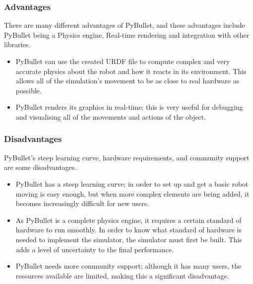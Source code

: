 \documentclass[a4paper,11pt]{article}
\begin{document}
\subsubsection{Advantages}

There are many different advantages of PyBullet, and these advantages include PyBullet being a Physics engine, Real-time rendering and integration with other libraries.

\begin{itemize}
  \item PyBullet can use the created URDF file to compute complex and very accurate physics about the robot and how it reacts in its environment. This allows all of the simulation's movement to be as close to real hardware as possible.

  \item PyBullet renders its graphics in real-time; this is very useful for debugging and visualising all of the movements and actions of the object.

\end{itemize}

\subsubsection{Disadvantages}

PyBullet's steep learning curve, hardware requirements, and community support are some disadvantages. 
\begin{itemize}
  \item PyBullet has a steep learning curve; in order to set up and get a basic robot moving is easy enough, but when more complex elements are being added, it becomes increasingly difficult for new users.
  \item As PyBullet is a complete physics engine, it requires a certain standard of hardware to run smoothly. In order to know what standard of hardware is needed to implement the simulator, the simulator must first be built. This adds a level of uncertainty to the final performance.
  \item PyBullet needs more community support; although it has many users, the resources available are limited, making this a significant disadvantage. 

\end{itemize}
 
\end{document}
